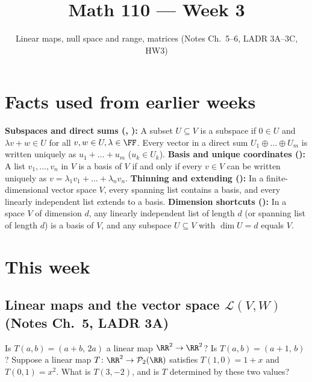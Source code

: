 \documentclass[10pt]{scrartcl}
\title{Math 110 --- Week 3}
\subtitle{Linear maps, null space and range, matrices (Notes Ch.~5--6, LADR 3A--3C, HW3)}
\author{}\date{}\ihead{}
\newcommand{\PP}{\mathcal P}\newcommand{\LL}{\mathcal L}\newcommand{\MM}{\mathcal M}
\begin{document}
\maketitle

\section{Facts used from earlier weeks}
\begin{enumerate}[label=(W\arabic*),leftmargin=2.8em,itemsep=4pt]
  \ii{} \textbf{Subspaces and direct sums (, ):} A subset $U\subseteq V$ is a subspace if $0\in U$ and $\lambda v+w\in U$ for all $v,w\in U,\lambda\in\FF$. Every vector in a direct sum $U_1\oplus\dots\oplus U_m$ is written uniquely as $u_1+\dots+u_m$ ($u_k\in U_k$).
  \ii{} \textbf{Basis and unique coordinates ():} A list $v_1,\dots,v_n$ in $V$ is a basis of $V$ if and only if every $v\in V$ can be written uniquely as $v=\lambda_1v_1+\dots+\lambda_nv_n$.
  \ii{} \textbf{Thinning and extending ():} In a finite-dimensional vector space $V$, every spanning list contains a basis, and every linearly independent list extends to a basis.
  \ii{} \textbf{Dimension shortcuts ():} In a space $V$ of dimension $d$, any linearly independent list of length $d$ (or spanning list of length $d$) is a basis of $V$, and any subspace $U\subseteq V$ with $\dim U=d$ equals $V$.
\end{enumerate}

\section{This week}

\subsection{Linear maps and the vector space $\LL(V,W)$ (Notes Ch.~5, LADR 3A)}

\begin{qbox}
  Is $T(a,b)=(a+b,\,2a)$ a linear map $\RR^2\to\RR^2$? Is $T(a,b)=(a+1,\,b)$? Suppose a linear map $T\colon\RR^2\to\PP_2(\RR)$ satisfies $T(1,0)=1+x$ and $T(0,1)=x^2$. What is $T(3,-2)$, and is $T$ determined by these two values?
\end{qbox}
\end{document}
